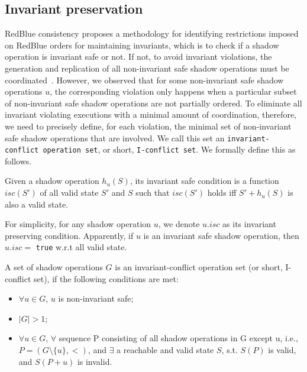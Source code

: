 \subsection{Invariant preservation}
\label{sec:properties:inv}
RedBlue consistency proposes a methodology
for identifying restrictions imposed on RedBlue orders for maintaining invariants,
which is to check if
a shadow operation is invariant safe or not. If not, to avoid invariant 
violations, the generation and replication of all non-invariant safe shadow operations must be coordinated~\cite{Li2012RedBlue}. 
However, we observed that for some non-invariant safe shadow operations $u$, the corresponding violation
only happens when a particular subset of non-invariant safe shadow operations are not partially ordered. 
To eliminate all invariant violating executions with a minimal amount of coordination, therefore, 
we need to precisely define, for each violation, the minimal
set of non-invariant safe shadow operations that are involved. We call this
set an {\tt invariant-conflict operation set}, or short, {\tt I-conflict set}. We formally define this 
as follows.

\begin{mydef}
 Given a shadow operation $h_{u}(S)$, its invariant safe
condition is a function $isc(S')$ of all valid state $S'$ and $S$ such that $isc(S')$ holds iff
$S' + h_{u}(S)$ is also a valid state. 
\label{def:isafecond}
\end{mydef}

For simplicity, for any shadow operation $u$, we denote $u.isc$ as its invariant preserving condition. Apparently,
if $u$ is an invariant safe shadow operation, then $u.isc = $ {\tt true} w.r.t all valid state.
\fi
\begin{mydef}
 A set of
shadow operations $G$ is an invariant-conflict operation set (or short, I-conflict set), if
the following conditions are met:
\begin{itemize}
 \item $\forall u \in G$, $u$ is non-invariant safe;
 \item $|G| > 1$;
 \item $\forall u \in G$, $\forall$ sequence P consisting of all shadow operations in G except u, i.e.,
$P = (G \setminus \{u\}, <)$, and $\exists$ a reachable and valid state $S$, s.t. $S(P)$ is valid, and
$S(P + u)$ is invalid.
\end{itemize}
\label{def:iconflictset}
\end{mydef}

